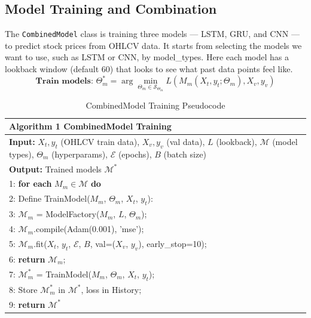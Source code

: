 \subsection{Model Training and Combination}

The \texttt{CombinedModel} class is training three models — LSTM, GRU, and CNN — to predict stock prices from OHLCV data. It starts from selecting the models we want to use, such as LSTM or CNN, by model\_types. Here each model has a lookback window (default 60) that looks to see what past data points feel like. 
\begin{equation}
\textbf{Train models: }\Theta_m^* = \arg\min_{\Theta_m \in \mathcal{S}_{\Theta_m}} L(M_m(X_t, y_t; \Theta_m), X_v, y_v)
\end{equation}

\begin{table}[h]
\small
\centering
\begin{tabular}{|p{10cm}|}
\hline
\textbf{Algorithm 1 CombinedModel Training} \\
\hline
\textbf{Input:} $X_t, y_t$ (OHLCV train data), $X_v, y_v$ (val data), $L$ (lookback), $\mathcal{M}$ (model types), $\Theta_m$ (hyperparams), $\mathcal{E}$ (epochs), $B$ (batch size) \\
\textbf{Output:} Trained models $\mathcal{M}^*$ \\
\hline
1: \textbf{for each} $M_m \in \mathcal{M}$ \textbf{do} \\
2: \quad Define TrainModel($M_m$, $\Theta_m$, $X_t$, $y_t$): \\
3: \quad\quad $\mathcal{M}_m$ = ModelFactory($M_m$, $L$, $\Theta_m$); \\
4: \quad\quad $\mathcal{M}_m$.compile(Adam(0.001), 'mse'); \\
5: \quad\quad $\mathcal{M}_m$.fit($X_t$, $y_t$, $\mathcal{E}$, $B$, val=($X_v$, $y_v$), early\_stop=10); \\
6: \quad\quad \textbf{return} $\mathcal{M}_m$; \\
7: \quad $\mathcal{M}_m^*$ = TrainModel($M_m$, $\Theta_m$, $X_t$, $y_t$); \\
8: \quad Store $\mathcal{M}_m^*$ in $\mathcal{M}^*$, loss in History; \\
9: \textbf{return} $\mathcal{M}^*$ \\
\hline
\end{tabular}
\caption{CombinedModel Training Pseudocode}
\label{tab:combined_dl_model_train}
\end{table}

